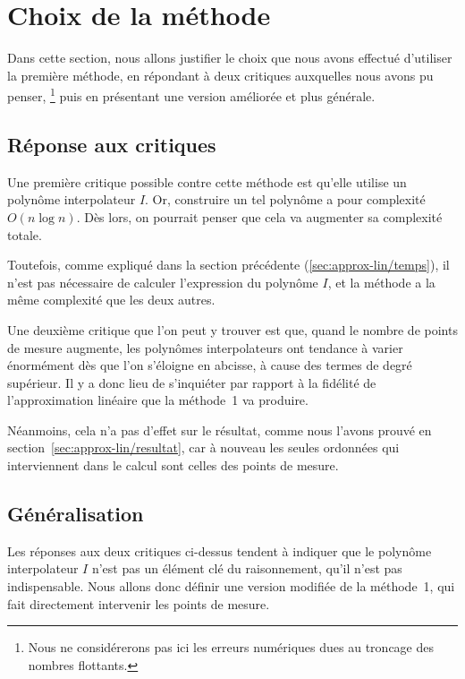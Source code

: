 \section{Choix de la méthode}

Dans cette section, nous allons justifier
le choix que nous avons effectué d'utiliser la première méthode,
en répondant à deux critiques auxquelles nous avons pu penser,%
\footnote{
    Nous ne considérerons pas ici les erreurs numériques
    dues au troncage des nombres flottants.
}
puis en présentant une version améliorée et plus générale.

\subsection{Réponse aux critiques}

Une première critique possible contre cette méthode
est qu'elle utilise un polynôme interpolateur $I$.
Or, construire un tel polynôme a pour complexité $O(n\log n)$.
\cite{lagrange-complexity}
Dès lors, on pourrait penser que cela va augmenter sa complexité totale.

Toutefois, comme expliqué dans la section précédente
(\ref{sec:approx-lin/temps}),
il n'est pas nécessaire de calculer l'expression du polynôme $I$,
et la méthode a la même complexité que les deux autres.

Une deuxième critique que l'on peut y trouver est que,
quand le nombre de points de mesure augmente,
les polynômes interpolateurs ont tendance à varier énormément
dès que l'on s'éloigne en abcisse,
à cause des termes de degré supérieur.
Il y a donc lieu de s'inquiéter par rapport à la fidélité
de l'approximation linéaire que la méthode~1 va produire.

Néanmoins, cela n'a pas d'effet sur le résultat, comme nous l'avons
prouvé en section~\ref{sec:approx-lin/resultat},
car à nouveau les seules ordonnées qui interviennent dans le calcul
sont celles des points de mesure.

\subsection{Généralisation}

Les réponses aux deux critiques ci-dessus tendent à indiquer
que le polynôme interpolateur $I$ n'est pas un élément clé du raisonnement,
qu'il n'est pas indispensable.
Nous allons donc définir une version modifiée de la méthode~1,
qui fait directement intervenir les points de mesure.

